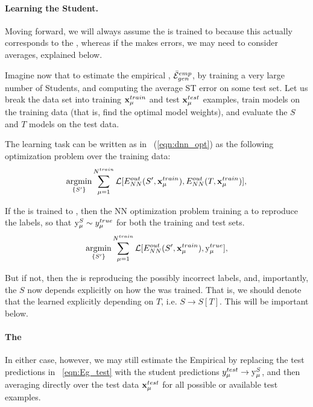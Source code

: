 \paragraph{Learning the Student.}
Moving forward, we will always assume the \Teacher is trained to \Interpolation because this
actually corresponds to the \AnnealedApproximation, whereas if the \Teacher makes
errors, we may need to consider \Quenched averages, explained below.

Imagine now that to estimate the empirical \AverageGeneralizationError, $\bar{\mathcal{E}}^{emp}_{gen}$,
by training a very large number of Students, and computing the average ST error on some test set.
Let us break the data set into training $\mathbf{x}_{\mu}^{train}$ and test $\mathbf{x}_{\mu}^{test}$ examples, 
train models on the training data (that is, find the optimal model weights), 
and evaluate the $S$ and $T$ models on the test data.

The \Student learning task can be written as in \EQN~(\ref{eqn:dnn_opt})
as the following optimization problem over the training data:
\begin{align}
\underset{\{S'\}}{\text{argmin}}\sum_{\mu=1}^{N^{train}}\mathcal{L}[E^{out}_{NN}(S',\mathbf{x}_{\mu}^{train}),E^{out}_{NN}(T,\mathbf{x}_{\mu}^{train})]   ,
\label{eqn:ST-learning-task}
\end{align}

If the \Teacher is trained to \Interpolation, then the NN optimization problem 
training a \Student to reproduce the \GroundTruth labels, so that $\mathrm{y}_{\mu}^{S}\sim y_{\mu}^{true}$
for both the training and test sets.
\begin{align}
\underset{\{S'\}}{\text{argmin}}\sum_{\mu=1}^{N^{train}}\mathcal{L}[E^{out}_{NN}(S',\mathbf{x}_{\mu}^{train}),\mathrm{y}_{\mu}^{true}]   ,
\label{eqn:ST-learning-intepolation}
\end{align}

But if not, then the \Student is reproducing the possibly
incorrect \Teacher labels, and, importantly, the \Student $S$ now depends explicitly
on how the \Teacher was trained.  That is, we should denote that the learned
\Student explicitly depending on $T$, i.e. $S\rightarrow S[T]$.
This will be important below.

\paragraph{The \AverageGeneralizationError}
In either case, however, we may still estimate the Empirical \AverageGeneralizationError
by replacing the test predictions in \EQN~\ref{eqn:Eg_test} with the student predictions
$y_{\mu}^{test}\rightarrow \mathrm{y}_{\mu}^{S}$, and then averaging directly over the test data $\mathbf{x}_{\mu}^{test}$
for all possible or available test examples.

